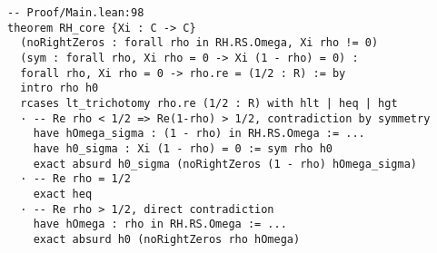 \begin{lstlisting}[language=Lean]
-- Proof/Main.lean:98
theorem RH_core {Xi : C -> C}
  (noRightZeros : forall rho in RH.RS.Omega, Xi rho != 0)
  (sym : forall rho, Xi rho = 0 -> Xi (1 - rho) = 0) :
  forall rho, Xi rho = 0 -> rho.re = (1/2 : R) := by
  intro rho h0
  rcases lt_trichotomy rho.re (1/2 : R) with hlt | heq | hgt
  · -- Re rho < 1/2 => Re(1-rho) > 1/2, contradiction by symmetry
    have hOmega_sigma : (1 - rho) in RH.RS.Omega := ...
    have h0_sigma : Xi (1 - rho) = 0 := sym rho h0
    exact absurd h0_sigma (noRightZeros (1 - rho) hOmega_sigma)
  · -- Re rho = 1/2
    exact heq
  · -- Re rho > 1/2, direct contradiction
    have hOmega : rho in RH.RS.Omega := ...
    exact absurd h0 (noRightZeros rho hOmega)
\end{lstlisting}



